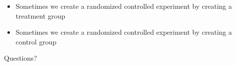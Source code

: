 \documentclass[aspectratio=169]{beamer}
\begin{document}
\begin{frame}

\begin{itemize}
\item Sometimes we create a randomized controlled experiment by creating a treatment group 
\item Sometimes we create a randomized controlled experiment by creating a control group
\end{itemize}

\end{frame}
\begin{frame}

\begin{center}
\end{center}

\end{frame}
\begin{frame}

\begin{center}
\LARGE Questions? 
\end{center}

\end{frame}
\end{document}
